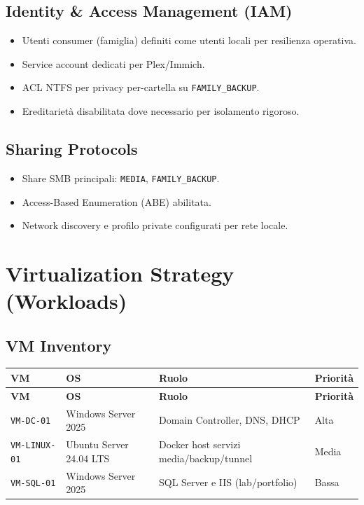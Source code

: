 \documentclass[11pt,a4paper]{article}
\begin{document}
\subsection{Identity \& Access Management (IAM)}
\begin{itemize}
  \item Utenti consumer (famiglia) definiti come utenti locali per resilienza operativa.
  \item Service account dedicati per Plex/Immich.
  \item ACL NTFS per privacy per-cartella su \texttt{FAMILY\_BACKUP}.
  \item Ereditarietà disabilitata dove necessario per isolamento rigoroso.
\end{itemize}

\subsection{Sharing Protocols}
\begin{itemize}
  \item Share SMB principali: \texttt{MEDIA}, \texttt{FAMILY\_BACKUP}.
  \item Access-Based Enumeration (ABE) abilitata.
  \item Network discovery e profilo private configurati per rete locale.
\end{itemize}

\section{Virtualization Strategy (Workloads)}

\subsection{VM Inventory}
\begin{longtable}{>{\raggedright\arraybackslash}p{} >{\raggedright\arraybackslash}p{} >{\raggedright\arraybackslash}p{} >{\raggedright\arraybackslash}p{}}
\toprule
\textbf{VM} & \textbf{OS} & \textbf{Ruolo} & \textbf{Priorità} \\
\midrule
\endfirsthead
\toprule
\textbf{VM} & \textbf{OS} & \textbf{Ruolo} & \textbf{Priorità} \\
\midrule
\endhead
\texttt{VM-DC-01} & Windows Server 2025 & Domain Controller, DNS, DHCP & Alta \\
\texttt{VM-LINUX-01} & Ubuntu Server 24.04 LTS & Docker host servizi media/backup/tunnel & Media \\
\texttt{VM-SQL-01} & Windows Server 2025 & SQL Server e IIS (lab/portfolio) & Bassa \\
\bottomrule
\end{longtable}
\end{document}
